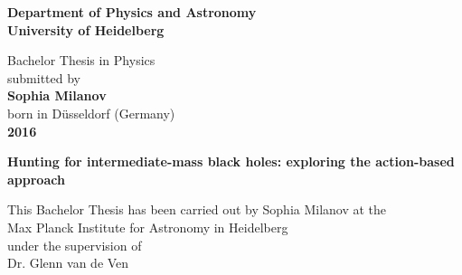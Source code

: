 \begin{titlepage}
\begin{center}
 
\Large\textbf{Department of Physics and Astronomy\\
University of Heidelberg}

\vspace{15cm}

\normalsize
Bachelor Thesis in Physics\\
submitted by \\
\vspace{0.5cm}
\Large\textbf{Sophia Milanov}\\
\normalsize
\vspace{0.5cm}
born in Düsseldorf (Germany)\\
\vspace{0.5cm}
\Large\textbf{2016}
\normalsize

\newpage




\Large\textbf{Hunting for intermediate-mass black holes: exploring the action-based approach}

\vspace{18cm}

\normalsize
This Bachelor Thesis has been carried out by Sophia Milanov at the\\
Max Planck Institute for Astronomy in Heidelberg\\
under the supervision of\\
Dr. Glenn van de Ven

\vfill
\end{center}

\end{titlepage}
